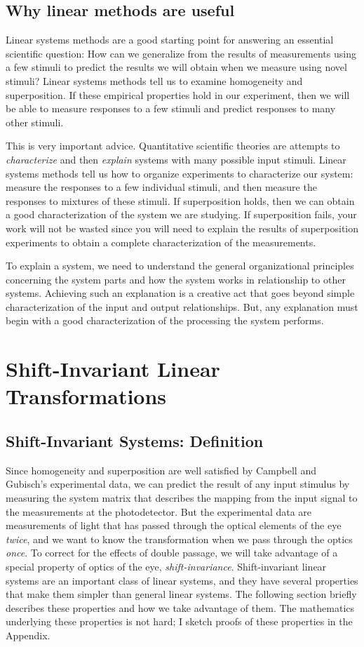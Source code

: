 \subsection*{Why linear methods are useful}
Linear systems methods are a good starting
point for answering an essential scientific question:
How can we generalize from the results of measurements using
a few stimuli to predict the results we will obtain when
we measure using novel stimuli?
Linear systems methods tell us to examine homogeneity and superposition.
If these empirical properties hold in our experiment, then we
will be able to measure responses to a few stimuli
and predict responses to many other stimuli.

This is very important advice.
Quantitative scientific theories are attempts
to {\em characterize} and then {\em explain} systems
with many possible input stimuli.
Linear systems methods tell us how to organize experiments
to characterize our system:
measure the responses to a few individual stimuli, and then
measure the responses to mixtures of these stimuli.
If superposition holds, then we can obtain a good characterization
of the system we are studying.
If superposition fails,
your work will not be wasted since
you will need to explain the results of superposition experiments
to obtain a complete characterization of the measurements.

To explain a system, we need to understand the general
organizational principles concerning the system parts and how
the system works in relationship to other systems.
Achieving such an explanation is a creative act that
goes beyond simple characterization of the input and output
relationships.
But, any explanation must begin with a good characterization
of the processing the system performs.

\section{Shift-Invariant Linear Transformations}
\label{sec1:ShiftInvariance}
\subsection*{Shift-Invariant Systems:  Definition}
Since homogeneity and superposition are well satisfied
by Campbell and Gubisch's experimental data,
we can predict the result of any input stimulus
by measuring the system matrix that describes the mapping from
the input signal to the measurements at the photodetector.
But the experimental data are measurements of light that has passed
through the optical elements of the eye {\em twice},
and we want to know the transformation when we pass
through the optics {\em once}.
To correct for the effects of double passage,
we will take advantage of a
special property of optics of the eye, {\em shift-invariance}.
Shift-invariant linear systems are an important
class of linear systems, and
they have several properties that make them
simpler than general linear systems.
The following section briefly describes these properties
and how we take advantage of them.
The mathematics underlying these properties is not hard;
I sketch proofs of these properties in the Appendix.


